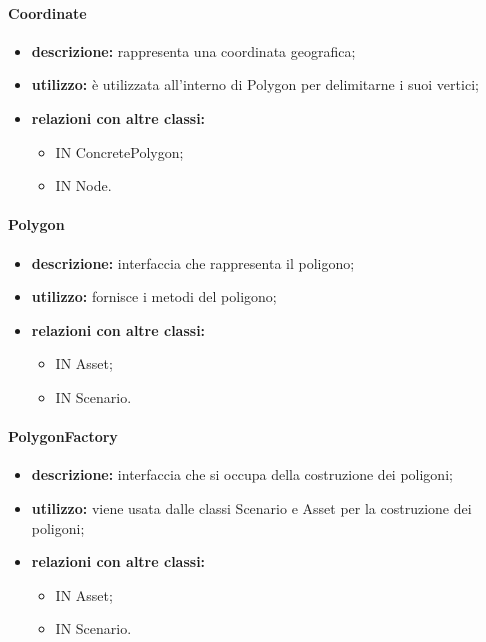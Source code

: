 \paragraph{Coordinate}
\begin{itemize}
	\item \textbf{descrizione:} rappresenta una coordinata geografica;
	\item \textbf{utilizzo:} è utilizzata all'interno di Polygon per delimitarne i suoi vertici;
	\item \textbf{relazioni con altre classi:} 
	\begin{itemize}
		\item IN ConcretePolygon;
		\item IN Node.
	\end{itemize}
\end{itemize}
\paragraph{Polygon}
\begin{itemize}
	\item \textbf{descrizione:} interfaccia che rappresenta il poligono;
	\item \textbf{utilizzo:} fornisce i metodi del poligono;
	\item \textbf{relazioni con altre classi:} 
	\begin{itemize}
		\item IN Asset;
		\item IN Scenario.
	\end{itemize}
\end{itemize}
\paragraph{PolygonFactory}
\begin{itemize}
	\item \textbf{descrizione:} interfaccia che si occupa della costruzione dei poligoni;
	\item \textbf{utilizzo:} viene usata dalle classi Scenario e Asset per la costruzione dei poligoni;
	\item \textbf{relazioni con altre classi:} 
	\begin{itemize}
		\item IN Asset;
		\item IN Scenario.
	\end{itemize}
\end{itemize}
\newpage
